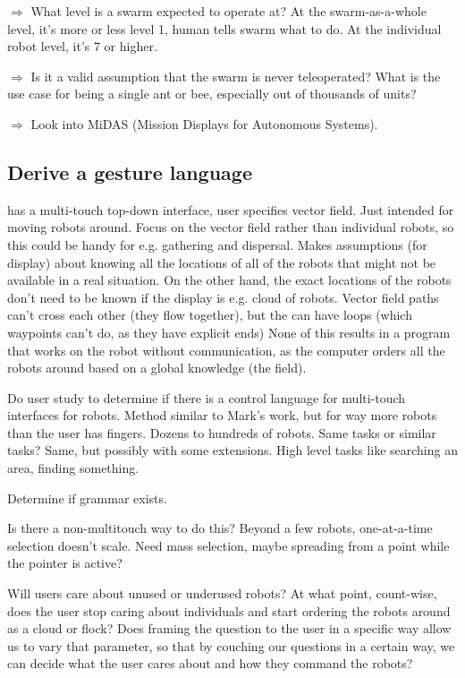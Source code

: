 \documentclass[]{article}
\begin{document}
$\Rightarrow$ What level is a swarm expected to operate at? At the swarm-as-a-whole level, it's more or less level 1, human tells swarm what to do. At the individual robot level, it's 7 or higher. 

$\Rightarrow$ Is it a valid assumption that the swarm is never teleoperated? What is the use case for being a single ant or bee, especially out of thousands of units?

$\Rightarrow$ Look into MiDAS (Mission Displays for Autonomous Systems). 

\subsection{Derive a gesture language}

\cite{Kato:2009:MIC:1520340.1520500} has a multi-touch top-down interface, user specifies vector field. Just intended for moving robots around. Focus on the vector field rather than individual robots, so this could be handy for e.g. gathering and dispersal. Makes assumptions (for display) about knowing all the locations of all of the robots that might not be available in a real situation. On the other hand, the exact locations of the robots don't need to be known if the display is e.g. cloud of robots. Vector field paths can't cross each other (they flow together), but the can have loops (which waypoints can't do, as they have explicit ends) None of this results in a program that works on the robot without communication, as the computer orders all the robots around based on a global knowledge (the field).


Do user study to determine if there is a control language for multi-touch interfaces for robots.
Method similar to Mark's work, but for way more robots than the user has fingers. 
Dozens to hundreds of robots. 
Same tasks or similar tasks? Same, but possibly with some extensions. 
High level tasks like searching an area, finding something. 

Determine if grammar exists. 

Is there a non-multitouch way to do this? Beyond a few robots, one-at-a-time selection doesn't scale. Need mass selection, maybe spreading from a point while the pointer is active?

Will users care about unused or underused robots? At what point, count-wise, does the user stop caring about individuals and start ordering the robots around as a cloud or flock? Does framing the question to the user in a specific way allow us to vary that parameter, so that by couching our questions in a certain way, we can decide what the user cares about and how they command the robots?
\end{document}
